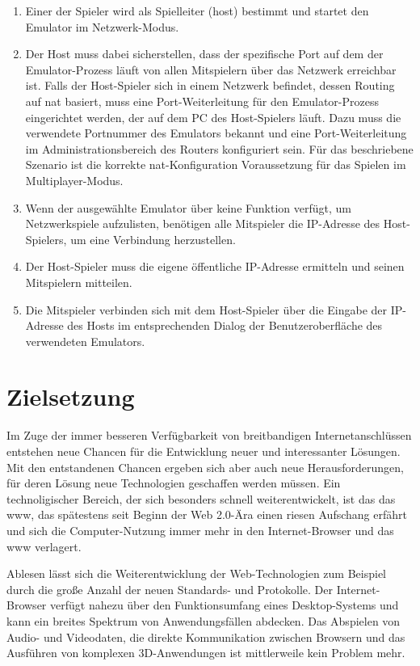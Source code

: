 \begin{enumerate}
\def\labelenumi{\arabic{enumi}.}
\tightlist
\item
  Einer der Spieler wird als Spielleiter (\gls{host}) bestimmt und
  startet den Emulator im Netzwerk-Modus.
\item
  Der Host muss dabei sicherstellen, dass der spezifische Port auf dem
  der Emulator-Prozess läuft von allen Mitspielern über das Netzwerk
  erreichbar ist. Falls der Host-Spieler sich in einem Netzwerk
  befindet, dessen Routing auf \gls{nat} basiert, muss eine
  Port-Weiterleitung für den Emulator-Prozess eingerichtet werden, der
  auf dem PC des Host-Spielers läuft. Dazu muss die verwendete
  Portnummer des Emulators bekannt und eine Port-Weiterleitung im
  Administrationsbereich des Routers konfiguriert sein. Für das
  beschriebene Szenario ist die korrekte \gls{nat}-Konfiguration
  Voraussetzung für das Spielen im Multiplayer-Modus.
\item
  Wenn der ausgewählte Emulator über keine Funktion verfügt, um
  Netzwerkspiele aufzulisten, benötigen alle Mitspieler die IP-Adresse
  des Host-Spielers, um eine Verbindung herzustellen.
\item
  Der Host-Spieler muss die eigene öffentliche IP-Adresse ermitteln und
  seinen Mitspielern mitteilen.
\item
  Die Mitspieler verbinden sich mit dem Host-Spieler über die Eingabe
  der IP-Adresse des Hosts im entsprechenden Dialog der
  Benutzeroberfläche des verwendeten Emulators.
\end{enumerate}

\section{Zielsetzung}\label{zielsetzung}

Im Zuge der immer besseren Verfügbarkeit von breitbandigen
Internetanschlüssen entstehen neue Chancen für die Entwicklung neuer und
interessanter Lösungen. Mit den entstandenen Chancen ergeben sich aber
auch neue Herausforderungen, für deren Lösung neue Technologien
geschaffen werden müssen. Ein technoligischer Bereich, der sich
besonders schnell weiterentwickelt, ist das das \gls{www}, das
spätestens seit Beginn der Web 2.0-Ära einen riesen Aufschang erfährt
und sich die Computer-Nutzung immer mehr in den Internet-Browser und das
\gls{www} verlagert.

Ablesen lässt sich die Weiterentwicklung der Web-Technologien zum
Beispiel durch die große Anzahl der neuen Standards- und Protokolle. Der
Internet-Browser verfügt nahezu über den Funktionsumfang eines
Desktop-Systems und kann ein breites Spektrum von Anwendungsfällen
abdecken. Das Abspielen von Audio- und Videodaten, die direkte
Kommunikation zwischen Browsern und das Ausführen von komplexen
3D-Anwendungen ist mittlerweile kein Problem mehr.

